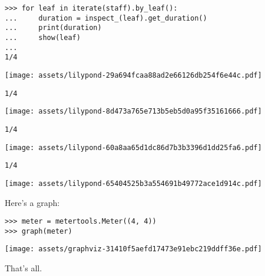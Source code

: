 \documentclass{article}
\begin{document}
\begin{lstlisting}
>>> for leaf in iterate(staff).by_leaf():
...     duration = inspect_(leaf).get_duration()
...     print(duration)
...     show(leaf)
...
1/4
\end{lstlisting}
\noindent\texttt{[image: assets/lilypond-29a694fcaa88ad2e66126db254f6e44c.pdf]}
\begin{lstlisting}
1/4
\end{lstlisting}
\noindent\texttt{[image: assets/lilypond-8d473a765e713b5eb5d0a95f35161666.pdf]}
\begin{lstlisting}
1/4
\end{lstlisting}
\noindent\texttt{[image: assets/lilypond-60a8aa65d1dc86d7b3b3396d1dd25fa6.pdf]}
\begin{lstlisting}
1/4
\end{lstlisting}
\noindent\texttt{[image: assets/lilypond-65404525b3a554691b49772ace1d914c.pdf]}

Here's a graph:

\begin{comment}
<abjad>
meter = metertools.Meter((4, 4))
graph(meter)
</abjad>
\end{comment}

\begin{lstlisting}
>>> meter = metertools.Meter((4, 4))
>>> graph(meter)
\end{lstlisting}
\noindent\texttt{[image: assets/graphviz-31410f5aefd17473e91ebc219ddff36e.pdf]}

That's all.
\end{document}
